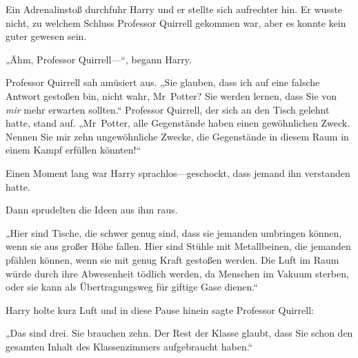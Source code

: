 Ein Adrenalinstoß durchfuhr Harry und er stellte sich aufrechter hin. Er wusste nicht, zu welchem Schluss Professor Quirrell gekommen war, aber es konnte kein guter gewesen sein.

„Ähm, Professor Quirrell—“, begann Harry.

Professor Quirrell sah amüsiert aus. „Sie glauben, dass ich auf eine falsche Antwort gestoßen bin, nicht wahr, Mr~Potter? Sie werden lernen, dass Sie von \emph{mir} mehr erwarten sollten.“ Professor Quirrell, der sich an den Tisch gelehnt hatte, stand auf. „Mr~Potter, alle Gegenstände haben einen gewöhnlichen Zweck. Nennen Sie mir zehn ungewöhnliche Zwecke, die Gegenstände in diesem Raum in einem Kampf erfüllen könnten!“

Einen Moment lang war Harry sprachlos—geschockt, dass jemand ihn verstanden hatte.

Dann sprudelten die Ideen aus ihm raus.

„Hier sind Tische, die schwer genug sind, dass sie jemanden umbringen können, wenn sie aus großer Höhe fallen. Hier sind Stühle mit Metallbeinen, die jemanden pfählen können, wenn sie mit genug Kraft gestoßen werden. Die Luft im Raum würde durch ihre Abwesenheit tödlich werden, da Menschen im Vakuum sterben, oder sie kann als Übertragungsweg für giftige Gase dienen.“

Harry holte kurz Luft und in diese Pause hinein sagte Professor Quirrell:

„Das sind drei. Sie brauchen zehn. Der Rest der Klasse glaubt, dass Sie schon den gesamten Inhalt des Klassenzimmers aufgebraucht haben.“

